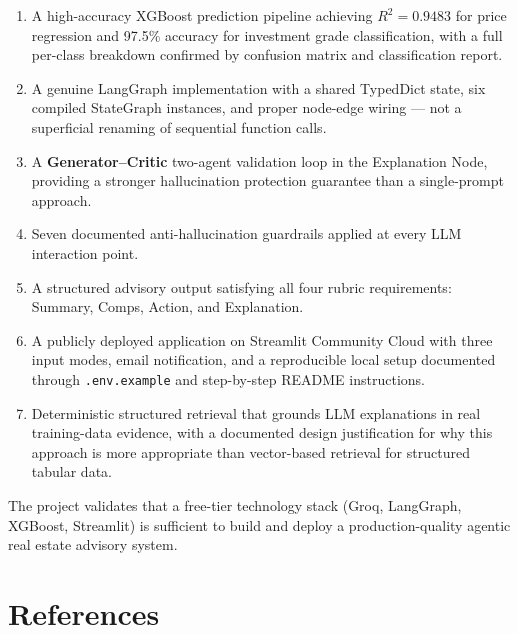 \documentclass[12pt,a4paper]{article}
\begin{document}
\begin{enumerate}[label=\arabic*., leftmargin=*, itemsep=5pt]
  \item A high-accuracy XGBoost prediction pipeline achieving $R^{2} = 0.9483$ for price regression and 97.5\% accuracy for investment grade classification, with a full per-class breakdown confirmed by confusion matrix and classification report.
  \item A genuine LangGraph implementation with a shared TypedDict state, six compiled StateGraph instances, and proper node-edge wiring --- not a superficial renaming of sequential function calls.
  \item A \textbf{Generator--Critic} two-agent validation loop in the Explanation Node, providing a stronger hallucination protection guarantee than a single-prompt approach.
  \item Seven documented anti-hallucination guardrails applied at every LLM interaction point.
  \item A structured advisory output satisfying all four rubric requirements: Summary, Comps, Action, and Explanation.
  \item A publicly deployed application on Streamlit Community Cloud with three input modes, email notification, and a reproducible local setup documented through \texttt{.env.example} and step-by-step README instructions.
  \item Deterministic structured retrieval that grounds LLM explanations in real training-data evidence, with a documented design justification for why this approach is more appropriate than vector-based retrieval for structured tabular data.
\end{enumerate}

The project validates that a free-tier technology stack (Groq, LangGraph, XGBoost, Streamlit) is sufficient to build and deploy a production-quality agentic real estate advisory system.

\section*{References}
\end{document}
